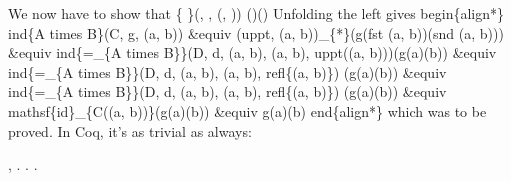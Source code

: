 We now have to show that
  \{  \}(, , (, )) 
   ()()
Unfolding the left gives
begin\{align*\}
  ind\{A times B\}(C, g, (a, b)) 
  \&equiv
  (uppt, (a, b))\_\{*\}(g(fst (a, b))(snd (a, b)))
  \&equiv
  ind\{=\_\{A times B\}\}(D, d, (a, b), (a, b), uppt((a, b)))(g(a)(b))
  \&equiv
  ind\{=\_\{A times B\}\}(D, d, (a, b), (a, b), refl\{(a, b)\})
  (g(a)(b))
  \&equiv
  ind\{=\_\{A times B\}\}(D, d, (a, b), (a, b), refl\{(a, b)\})
  (g(a)(b))
  \&equiv
  mathsf\{id\}\_\{C((a, b))\}(g(a)(b))
  \&equiv
  g(a)(b)
end\{align*\}
which was to be proved.  In Coq, it's as trivial as always:


\begin{coqdoccode}
\coqdocnoindent
{} \coqdockw{\ensuremath{\forall}}    ,      \coqdocnotation{=}   . . .\coqdoceol
\coqdocemptyline
\end{coqdoccode}



